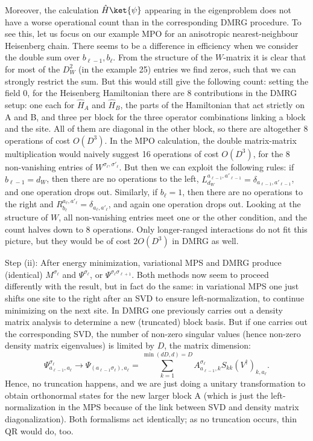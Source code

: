Moreover, the calculation $\hat{H}\ket{\psi}$ appearing in the eigenproblem does not have a worse operational count than in the corresponding DMRG procedure. To see this, let us focus on our example MPO for an anisotropic nearest-neighbour Heisenberg chain. There seems to be a difference in efficiency when we consider the double sum over $b_{\ell-1}, b_{\ell}$. From the structure of the $W$-matrix it is clear that for most of the $D_W^2$ (in the example 25) entries we find zeros, such that we can strongly restrict the sum. But this would still give the following count: setting the field 0, for the Heisenberg Hamiltonian there are 8 contributions in the DMRG setup: one each for $\hat{H}_A$ and $\hat{H}_B$, the parts of the Hamiltonian that act strictly on A and B, and three per block for the three operator combinations linking a block and the site. All of them are diagonal in the other block, so there are altogether 8 operations of cost $O(D^3)$. In the MPO calculation, the double matrix-matrix multiplication would naively suggest 16 operations of cost $O(D^3)$, for the 8 non-vanishing entries of $W^{\sigma_{\ell},\sigma'_{\ell}}$. But then we can exploit the following rules: if $b_{\ell-1}=d_W$, then there are no operations to the left, $L^{a_{\ell-1}, a'_{\ell-1}}_{d_W}= \delta_{a_{\ell-1}, a'_{\ell-1}}$, and one operation drops out. Similarly, if $b_{\ell}=1$, then there are no operations to the right and $R^{a_{\ell},a'_{\ell}}_{b_{\ell}}=\delta_{a_{\ell},a'_{\ell}}$, and again one operation drops out. Looking at the structure of $W$, all non-vanishing entries meet one or the other condition, and the count halves down to 8 operations. Only longer-ranged interactions do not fit this picture, but they would be of cost $2O(D^3)$ in DMRG as well.

Step (ii): After energy minimization, variational MPS and DMRG produce (identical) $M^{\sigma_\ell}$ and $\Psi^{\sigma_\ell}$, or $\Psi^{\sigma_\ell \sigma_{\ell+1}}$. Both methods now seem to proceed differently with the result, but in fact do the same: in variational MPS one just shifts one site to the right after an SVD to ensure left-normalization, to continue minimizing on the next site. In DMRG one previously carries out a density matrix analysis to determine a new (truncated) block basis. But if one carries out the corresponding SVD, the number of non-zero singular values (hence non-zero density matrix eigenvalues) is limited by $D$, the matrix dimension: 
\begin{equation}
\Psi^{\sigma_\ell}_{a_{\ell-1},a_ \ell} \rightarrow \Psi_{(a_{\ell-1} \sigma_ \ell), a_ \ell} = \sum_{k=1}^{\min(dD,d)=D} A^{\sigma_ \ell}_{a_{\ell-1},k} S_{kk} (V^\dagger)_{k, a_ \ell} .
\end{equation}
Hence, no truncation happens, and we are just doing a unitary transformation to obtain orthonormal states for the new larger block A (which is just the left-normalization in the MPS because of the link between SVD and density matrix diagonalization). Both formalisms act identically; as no truncation occurs, thin QR would do, too.

